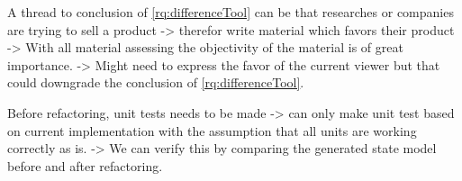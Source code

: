         A thread to conclusion of \ref{rq:differenceTool} can be that researches or companies are trying to sell a product -> therefor write material which favors their product -> With all material assessing the objectivity of the material is of great importance. -> Might need to express the favor of the current viewer \cite{thesisMulders} but that could downgrade the conclusion of \ref{rq:differenceTool}. 
        
        Before refactoring, unit tests needs to be made -> can only  make unit test based on current implementation with the assumption that all units are working correctly as is. -> We can verify this by comparing the generated state model before and after refactoring.